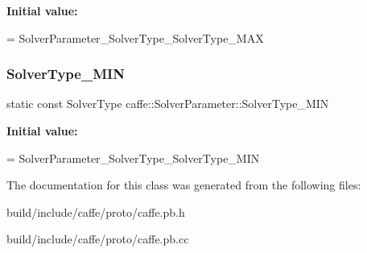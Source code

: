 {\bfseries Initial value\+:}
\begin{DoxyCode}
=
    SolverParameter\_SolverType\_SolverType\_MAX
\end{DoxyCode}
\mbox{\label{classcaffe_1_1_solver_parameter_af90bdf073fcee219e207b6aa6de79577}} 
\subsubsection{\texorpdfstring{Solver\+Type\+\_\+\+M\+IN}{SolverType\_MIN}}
{\footnotesize\ttfamily static const Solver\+Type caffe\+::\+Solver\+Parameter\+::\+Solver\+Type\+\_\+\+M\+IN\hspace{0.3cm}{\ttfamily [static]}}

{\bfseries Initial value\+:}
\begin{DoxyCode}
=
    SolverParameter\_SolverType\_SolverType\_MIN
\end{DoxyCode}


The documentation for this class was generated from the following files\+:\begin{DoxyCompactItemize}
\item 
build/include/caffe/proto/caffe.\+pb.\+h\item 
build/include/caffe/proto/caffe.\+pb.\+cc\end{DoxyCompactItemize}
